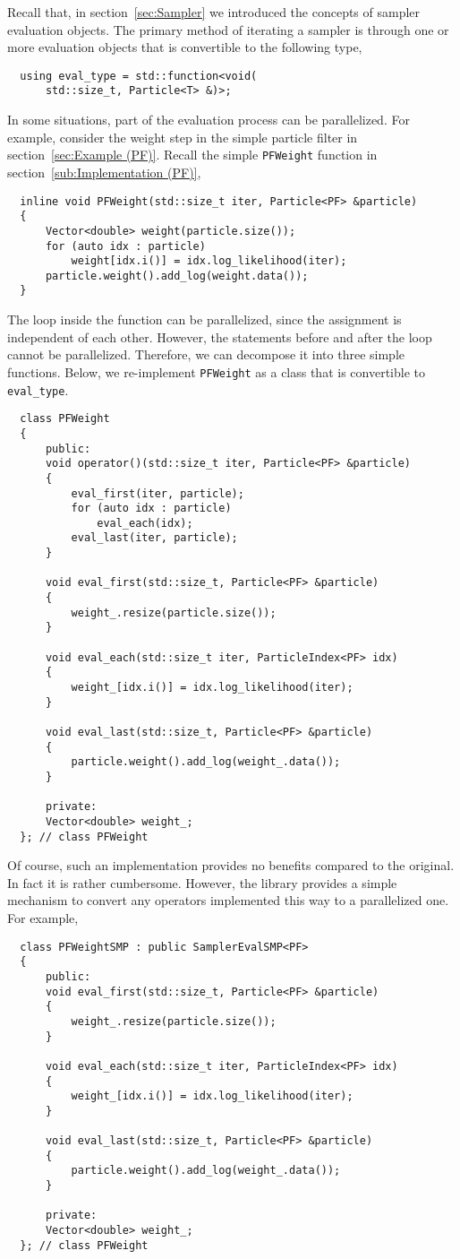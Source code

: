 Recall that, in section~\ref{sec:Sampler} we introduced the concepts of sampler
evaluation objects. The primary method of iterating a sampler is through
one or more evaluation objects that is convertible to the following type,
\begin{Verbatim}
  using eval_type = std::function<void(
      std::size_t, Particle<T> &)>;
\end{Verbatim}
In some situations, part of the evaluation process can be parallelized. For
example, consider the weight step in the simple particle filter in
section~\ref{sec:Example (PF)}. Recall the simple \verb|PFWeight| function in
section~\ref{sub:Implementation (PF)},
\begin{Verbatim}
  inline void PFWeight(std::size_t iter, Particle<PF> &particle)
  {
      Vector<double> weight(particle.size());
      for (auto idx : particle)
          weight[idx.i()] = idx.log_likelihood(iter);
      particle.weight().add_log(weight.data());
  }
\end{Verbatim}
The loop inside the function can be parallelized, since the assignment is
independent of each other. However, the statements before and after the loop
cannot be parallelized. Therefore, we can decompose it into three simple
functions. Below, we re-implement \verb|PFWeight| as a class that is
convertible to \verb|eval_type|.
\begin{Verbatim}
  class PFWeight
  {
      public:
      void operator()(std::size_t iter, Particle<PF> &particle)
      {
          eval_first(iter, particle);
          for (auto idx : particle)
              eval_each(idx);
          eval_last(iter, particle);
      }

      void eval_first(std::size_t, Particle<PF> &particle)
      {
          weight_.resize(particle.size());
      }

      void eval_each(std::size_t iter, ParticleIndex<PF> idx)
      {
          weight_[idx.i()] = idx.log_likelihood(iter);
      }

      void eval_last(std::size_t, Particle<PF> &particle)
      {
          particle.weight().add_log(weight_.data());
      }

      private:
      Vector<double> weight_;
  }; // class PFWeight
\end{Verbatim}
Of course, such an implementation provides no benefits compared to the
original. In fact it is rather cumbersome. However, the library provides a
simple mechanism to convert any operators implemented this way to a
parallelized one. For example,
\begin{Verbatim}
  class PFWeightSMP : public SamplerEvalSMP<PF>
  {
      public:
      void eval_first(std::size_t, Particle<PF> &particle)
      {
          weight_.resize(particle.size());
      }

      void eval_each(std::size_t iter, ParticleIndex<PF> idx)
      {
          weight_[idx.i()] = idx.log_likelihood(iter);
      }

      void eval_last(std::size_t, Particle<PF> &particle)
      {
          particle.weight().add_log(weight_.data());
      }

      private:
      Vector<double> weight_;
  }; // class PFWeight
\end{Verbatim}
